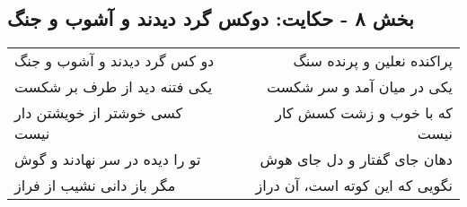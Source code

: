 \begin{center}
\section*{بخش ۸ - حکایت: دوکس گرد دیدند و آشوب و جنگ}
\label{sec:008}
\begin{longtable}{l p{0.5cm} r}
دو کس گرد دیدند و آشوب و جنگ
&&
پراکنده نعلین و پرنده سنگ
\\
یکی فتنه دید از طرف بر شکست
&&
یکی در میان آمد و سر شکست
\\
کسی خوشتر از خویشتن دار نیست
&&
که با خوب و زشت کسش کار نیست
\\
تو را دیده در سر نهادند و گوش
&&
دهان جای گفتار و دل جای هوش
\\
مگر باز دانی نشیب از فراز
&&
نگویی که این کوته است، آن دراز
\\
\end{longtable}
\end{center}
